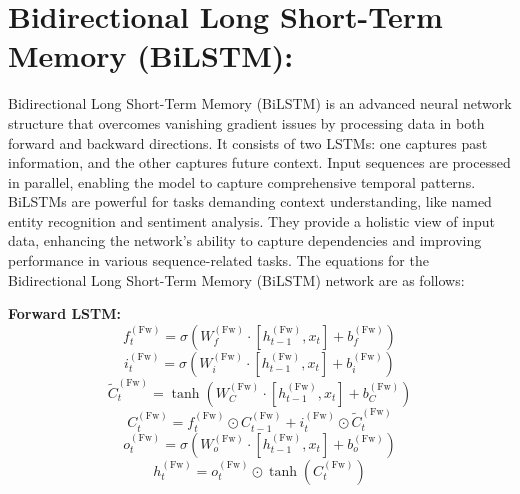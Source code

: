 \section{Bidirectional Long Short-Term Memory (BiLSTM):}
Bidirectional Long Short-Term Memory (BiLSTM) is an advanced neural network structure that overcomes vanishing gradient issues by processing data in both forward and backward directions. It consists of two LSTMs: one captures past information, and the other captures future context. Input sequences are processed in parallel, enabling the model to capture comprehensive temporal patterns. BiLSTMs are powerful for tasks demanding context understanding, like named entity recognition and sentiment analysis. They provide a holistic view of input data, enhancing the network's ability to capture dependencies and improving performance in various sequence-related tasks.
The equations for the Bidirectional Long Short-Term Memory (BiLSTM) network are as follows:

\textbf{Forward LSTM:}
\begin{equation}
f_t^{(\text{Fw})} = \sigma(W_{f}^{(\text{Fw})} \cdot [h_{t-1}^{(\text{Fw})}, x_t] + b_{f}^{(\text{Fw})})
\end{equation}
\begin{equation}
i_t^{(\text{Fw})} = \sigma(W_{i}^{(\text{Fw})} \cdot [h_{t-1}^{(\text{Fw})}, x_t] + b_{i}^{(\text{Fw})})
\end{equation}
\begin{equation}
\tilde{C}_t^{(\text{Fw})} = \tanh(W_{C}^{(\text{Fw})} \cdot [h_{t-1}^{(\text{Fw})}, x_t] + b_{C}^{(\text{Fw})})
\end{equation}
\begin{equation}
C_t^{(\text{Fw})} = f_t^{(\text{Fw})} \odot C_{t-1}^{(\text{Fw})} + i_t^{(\text{Fw})} \odot \tilde{C}_t^{(\text{Fw})}
\end{equation}
\begin{equation}
o_t^{(\text{Fw})} = \sigma(W_{o}^{(\text{Fw})} \cdot [h_{t-1}^{(\text{Fw})}, x_t] + b_{o}^{(\text{Fw})})
\end{equation}
\begin{equation}
h_t^{(\text{Fw})} = o_t^{(\text{Fw})} \odot \tanh(C_t^{(\text{Fw})})
\end{equation}

